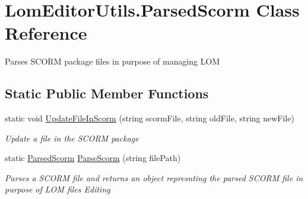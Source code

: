 \hypertarget{class_lom_editor_utils_1_1_parsed_scorm}{}\section{Lom\+Editor\+Utils.\+Parsed\+Scorm Class Reference}
\label{class_lom_editor_utils_1_1_parsed_scorm}


Parses S\+C\+O\+RM package files in purpose of managing L\+OM  


\subsection*{Static Public Member Functions}
\begin{DoxyCompactItemize}
\item 
static void \hyperlink{class_lom_editor_utils_1_1_parsed_scorm_af83ea5ea305876a63a3fe46270c84922}{Update\+File\+In\+Scorm} (string scorm\+File, string old\+File, string new\+File)
\begin{DoxyCompactList}\small\item\em Update a file in the S\+C\+O\+RM package \end{DoxyCompactList}\item 
static \hyperlink{class_lom_editor_utils_1_1_parsed_scorm}{Parsed\+Scorm} \hyperlink{class_lom_editor_utils_1_1_parsed_scorm_a1d6075c98d793928e9e5d55767c41034}{Parse\+Scorm} (string file\+Path)
\begin{DoxyCompactList}\small\item\em Parses a S\+C\+O\+RM file and returns an object represnting the parsed S\+C\+O\+RM file in purpose of L\+OM files Editing \end{DoxyCompactList}\end{DoxyCompactItemize}
